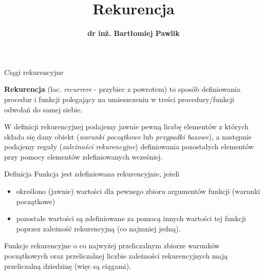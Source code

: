 \documentclass[a4paper,10pt]{beamer}
\title{\bf Rekurencja}
\author[B. Pawlik]{\bf dr inż. Bartłomiej Pawlik}
\begin{document}
\begin{frame}
\titlepage
\end{frame}





\begin{frame}{Ciągi rekurencyjne}
	
	\begin{block}{}
		{\bf Rekurencja} (łac. {\it recurrere} - przybiec z powrotem) to sposób definiowania procedur i funkcji polegający na umieszczeniu w treści procedury/funkcji odwołań do samej siebie.
	\end{block}

	W definicji rekurencyjnej podajemy jawnie pewną liczbę elementów z których składa się dany obiekt ({\it warunki początkowe} lub {\it przypadki bazowe}), a następnie podajemy reguły ({\it zależności rekurencyjne}) definiowania pozostałych elementów przy pomocy elementów zdefiniowanych wcześniej.	
	
\end{frame}


\begin{frame}
	
	\begin{block}{Definicja}
		Funkcja jest zdefiniowana rekurencyjnie, jeżeli
		\begin{itemize}
			\item określono (jawnie) wartości dla pewnego zbioru argumentów funkcji (warunki początkowe)
			\item pozostałe wartości są zdefiniowane za pomocą innych wartości tej funkcji poprzez zależność rekurencyjną (co najmniej jedną).
		\end{itemize}		
	\end{block}

	Funkcje rekurencyjne o co najwyżej przeliczalnym zbiorze warunków początkowych oraz przeliczalnej liczbie zależności rekurencyjnych mają przeliczalną dziedzinę (więc są ciągami).
	
\end{frame}
\end{document}
